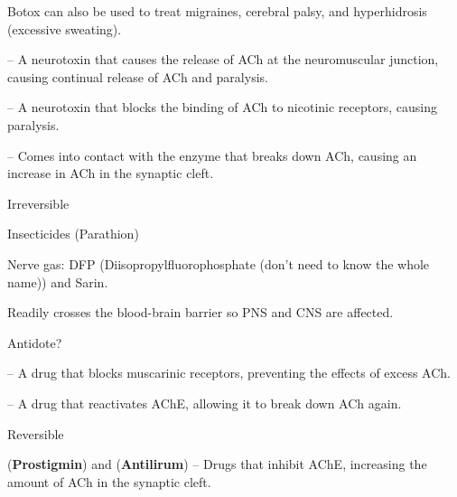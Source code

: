\begin{coloredlist}
\begin{coloredlist}
        \item Botox can also be used to treat migraines, cerebral palsy, and hyperhidrosis (excessive sweating).
    \end{coloredlist}
    \item {} -- A neurotoxin that causes the release of ACh at the neuromuscular junction, causing continual release of ACh and paralysis.
    \item {} -- A neurotoxin that blocks the binding of ACh to nicotinic receptors, causing paralysis.
    \item {} -- Comes into contact with the enzyme that breaks down ACh, causing an increase in ACh in the synaptic cleft.
    \begin{coloredlist}
        \item Irreversible
        \begin{coloredlist}
            \item Insecticides (Parathion)
            \item Nerve gas: DFP (Diisopropylfluorophosphate (don't need to know the whole name)) and Sarin.
            \begin{coloredlist}
                \item Readily crosses the blood-brain barrier so PNS and CNS are affected.
                \item Antidote?
                \begin{coloredlist}
                    \item {} -- A drug that blocks muscarinic receptors, preventing the effects of excess ACh.
                    \item {} -- A drug that reactivates AChE, allowing it to break down ACh again.
                \end{coloredlist}
            \end{coloredlist}
        \end{coloredlist}
        \item Reversible
        \begin{coloredlist}
            \item {} (\textbf{Prostigmin}) and  (\textbf{Antilirum}) -- Drugs that inhibit AChE, increasing the amount of ACh in the synaptic cleft.

\end{coloredlist}
\end{coloredlist}
\end{coloredlist}
